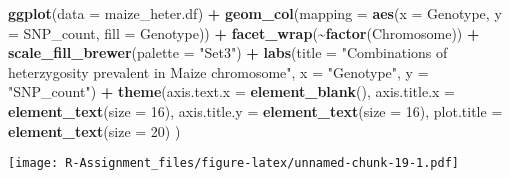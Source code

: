 \documentclass[
]{article}
\newenvironment{Shaded}{\begin{snugshade}}{\end{snugshade}}
\newcommand{\AttributeTok}[1]{\textcolor[rgb]{0.13,0.29,0.53}{#1}}
\newcommand{\DecValTok}[1]{\textcolor[rgb]{0.00,0.00,0.81}{#1}}
\newcommand{\FunctionTok}[1]{\textcolor[rgb]{0.13,0.29,0.53}{\textbf{#1}}}
\newcommand{\NormalTok}[1]{#1}
\newcommand{\SpecialCharTok}[1]{\textcolor[rgb]{0.81,0.36,0.00}{\textbf{#1}}}
\newcommand{\StringTok}[1]{\textcolor[rgb]{0.31,0.60,0.02}{#1}}
\begin{document}
\begin{Shaded}
\begin{Highlighting}[]
\FunctionTok{ggplot}\NormalTok{(}\AttributeTok{data =}\NormalTok{ maize\_heter.df) }\SpecialCharTok{+}
  \FunctionTok{geom\_col}\NormalTok{(}\AttributeTok{mapping =} \FunctionTok{aes}\NormalTok{(}\AttributeTok{x =}\NormalTok{ Genotype, }\AttributeTok{y =}\NormalTok{ SNP\_count, }\AttributeTok{fill =}\NormalTok{ Genotype)) }\SpecialCharTok{+}
  \FunctionTok{facet\_wrap}\NormalTok{(}\SpecialCharTok{\textasciitilde{}}\FunctionTok{factor}\NormalTok{(Chromosome)) }\SpecialCharTok{+}
  \FunctionTok{scale\_fill\_brewer}\NormalTok{(}\AttributeTok{palette =} \StringTok{"Set3"}\NormalTok{) }\SpecialCharTok{+}
  \FunctionTok{labs}\NormalTok{(}\AttributeTok{title =} \StringTok{"Combinations of heterzygosity prevalent in Maize chromosome"}\NormalTok{,}
       \AttributeTok{x =} \StringTok{"Genotype"}\NormalTok{,}
       \AttributeTok{y =} \StringTok{"SNP\_count"}\NormalTok{) }\SpecialCharTok{+}
  \FunctionTok{theme}\NormalTok{(}\AttributeTok{axis.text.x =} \FunctionTok{element\_blank}\NormalTok{(),}
        \AttributeTok{axis.title.x =} \FunctionTok{element\_text}\NormalTok{(}\AttributeTok{size =} \DecValTok{16}\NormalTok{),}
        \AttributeTok{axis.title.y =} \FunctionTok{element\_text}\NormalTok{(}\AttributeTok{size =} \DecValTok{16}\NormalTok{),}
        \AttributeTok{plot.title =} \FunctionTok{element\_text}\NormalTok{(}\AttributeTok{size =} \DecValTok{20}\NormalTok{)}
\NormalTok{  )}
\end{Highlighting}
\end{Shaded}

\texttt{[image: R-Assignment\_files/figure-latex/unnamed-chunk-19-1.pdf]}
\end{document}
